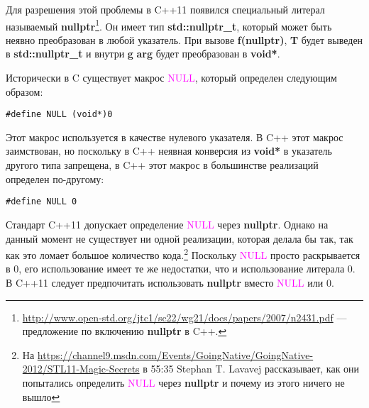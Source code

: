 Для разрешения этой проблемы в C++11 появился специальный литерал называемый {\bf nullptr}\footnote{\url{http://www.open-std.org/jtc1/sc22/wg21/docs/papers/2007/n2431.pdf} --- предложение по включению {\bf nullptr} в C++.}. Он имеет тип {\bf std::nullptr\_t}, который может быть неявно преобразован в любой указатель. При вызове {\bf f(nullptr)}, {\bf T} будет выведен в {\bf std::nullptr\_t} и внутри {\bf g} {\bf arg} будет преобразован в {\bf void*}.

Исторически в C существует макрос \textcolor{magenta}{NULL}, который определен следующим образом:
\begin{verbatim}
#define NULL (void*)0
\end{verbatim}
Этот макрос используется в качестве нулевого указателя. В C++ этот макрос заимствован, но поскольку в C++ неявная конверсия из {\bf void*} в указатель другого типа запрещена, в C++ этот макрос в большинстве реализаций определен по-другому:
\begin{verbatim}
#define NULL 0
\end{verbatim}
Стандарт C++11 допускает определение \textcolor{magenta}{NULL} через {\bf nullptr}. Однако на данный момент не существует ни одной реализации, которая делала бы так, так как это ломает большое количество кода.\footnote{На \url{https://channel9.msdn.com/Events/GoingNative/GoingNative-2012/STL11-Magic-Secrets} в 55:35 Stephan T. Lavavej рассказывает, как они попытались определить \textcolor{magenta}{NULL} через {\bf nullptr} и почему из этого ничего не вышло}
Поскольку \textcolor{magenta}{NULL} просто раскрывается в 0, его использование имеет те же недостатки, что и использование литерала 0. В C++11 следует предпочитать использовать {\bf nullptr} вместо \textcolor{magenta}{NULL} или 0.
